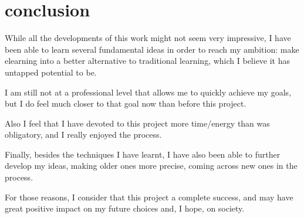 \documentclass[12pt]{article}
\begin{document}
\section{conclusion} \label{conclusion}

While all the developments of this work might not seem very impressive, I have been able to learn
several fundamental ideas in order to reach my ambition: make elearning into a better alternative
to traditional learning, which I believe it has untapped potential to be.

I am still not at a professional level that allows me to quickly achieve my goals, but I do feel much closer to
that goal now than before this project.

Also I feel that I have devoted to this project more time/energy
than was obligatory, and I really enjoyed the process.

Finally, besides the techniques I have learnt, I have also been able to further develop my ideas, making
older ones more precise, coming across new ones in the process.

For those reasons, I consider that this project a complete success, and may have great positive impact on
my future choices and, I hope, on society.

\newpage

\end{document}
